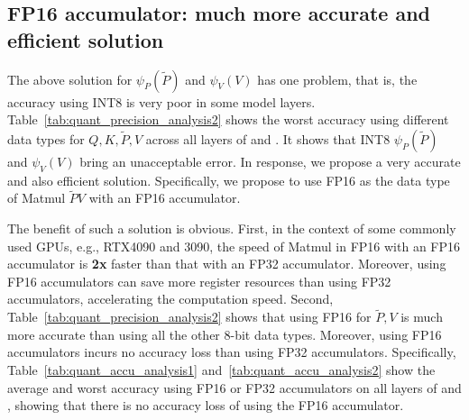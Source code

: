 \subsection{FP16 accumulator: much more accurate and efficient solution} \label{sec:fp16_acc}

The above solution for $\psi_P(\widetilde P)$ and $\psi_V(V)$ has one problem, that is, the accuracy using INT8 is very poor in some model layers. Table~\ref{tab:quant_precision_analysis2} shows the worst accuracy using different data types for $Q, K, \widetilde P, V$ across all layers
of \llama and \unidiffuser. It shows that INT8 $\psi_P(\widetilde P)$ and $\psi_V(V)$ bring an unacceptable error. 
In response, we propose a very accurate and also efficient solution. Specifically, we propose to use FP16 as the data type of Matmul $\widetilde P V$ with an FP16 accumulator. 

The benefit of such a solution is obvious. First, in the context of some commonly used GPUs, e.g., RTX4090 and 3090, the speed of Matmul in FP16 with an FP16 accumulator is \textbf{2x} faster than that with an FP32 accumulator. Moreover, using FP16 accumulators can save more register resources than using FP32 accumulators, accelerating the computation speed. 
Second, Table~\ref{tab:quant_precision_analysis2} shows that using FP16 for $\widetilde P, V$ is much more accurate than using all the other 8-bit data types. Moreover, using FP16 accumulators incurs no accuracy loss than using FP32 accumulators. Specifically, Table~\ref{tab:quant_accu_analysis1} and~\ref{tab:quant_accu_analysis2} show the average and worst accuracy using FP16 or FP32 accumulators on all layers of \llama and \unidiffuser, showing that there is no accuracy loss of using the FP16 accumulator.


\begin{table}[htb!]
    \centering
    \vspace{-.5em}
    \caption{Four kernel implementations of \our.}
    \label{tab:adaptive_types}
    \setlength\tabcolsep{5pt}
\end{table}


